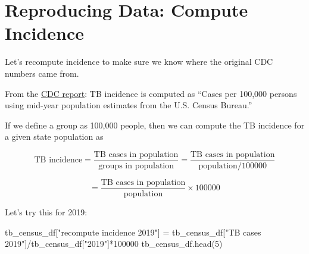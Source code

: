 \documentclass[
  letterpaper,
  DIV=11,
  numbers=noendperiod]{scrreprt}
\newenvironment{Shaded}{\begin{snugshade}}{\end{snugshade}}
\newcommand{\DecValTok}[1]{\textcolor[rgb]{0.68,0.00,0.00}{#1}}
\newcommand{\NormalTok}[1]{\textcolor[rgb]{0.00,0.23,0.31}{#1}}
\newcommand{\OperatorTok}[1]{\textcolor[rgb]{0.37,0.37,0.37}{#1}}
\newcommand{\StringTok}[1]{\textcolor[rgb]{0.13,0.47,0.30}{#1}}
\begin{document}
\hypertarget{reproducing-data-compute-incidence}{%
\section{Reproducing Data: Compute
Incidence}\label{reproducing-data-compute-incidence}}

Let's recompute incidence to make sure we know where the original CDC
numbers came from.

From the
\href{https://www.cdc.gov/mmwr/volumes/71/wr/mm7112a1.htm?s_cid=mm7112a1_w\#T1_down}{CDC
report}: TB incidence is computed as ``Cases per 100,000 persons using
mid-year population estimates from the U.S. Census Bureau.''

If we define a group as 100,000 people, then we can compute the TB
incidence for a given state population as

\[\text{TB incidence} = \frac{\text{TB cases in population}}{\text{groups in population}} = \frac{\text{TB cases in population}}{\text{population}/100000} \]

\[= \frac{\text{TB cases in population}}{\text{population}} \times 100000\]

Let's try this for 2019:

\begin{Shaded}
\begin{Highlighting}[]
\NormalTok{tb\_census\_df[}\StringTok{"recompute incidence 2019"}\NormalTok{] }\OperatorTok{=}\NormalTok{ tb\_census\_df[}\StringTok{"TB cases 2019"}\NormalTok{]}\OperatorTok{/}\NormalTok{tb\_census\_df[}\StringTok{"2019"}\NormalTok{]}\OperatorTok{*}\DecValTok{100000}
\NormalTok{tb\_census\_df.head(}\DecValTok{5}\NormalTok{)}
\end{Highlighting}
\end{Shaded}
\end{document}
